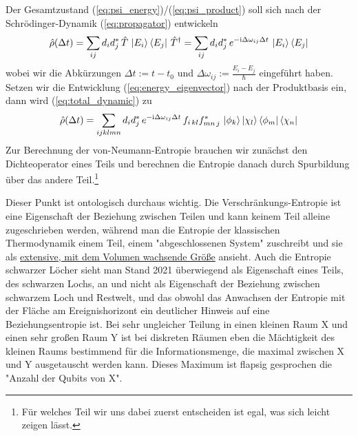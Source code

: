 \documentclass[12pt]{article}
\begin{document}
Der Gesamtzustand (\ref{eq:psi_energy})/(\ref{eq:psi_product}) soll sich nach der Schrödinger-Dynamik (\ref{eq:propagator}) entwickeln
\begin{equation}
\label{eq:total_dynamic}
\hat{\rho}(\Delta t)=\sum_{ij}d_{i}d_{j}^*\, \hat{T}\, \ket{E_i}\bra{E_j}\, {\hat{T}}^\dagger
= \sum_{ij}d_{i}d_{j}^*\, e^{-\mathrm i \Delta\omega_{ij}\Delta t}\, \ket{E_i}\bra{E_j}
\end{equation}
wobei wir die Abkürzungen $\Delta t := t-t_0$ und $\Delta \omega_{ij} := \frac{E_i - E_j}{\hbar}$ eingeführt haben. Setzen wir die Entwicklung (\ref{eq:energy_eigenvector}) nach der Produktbasis ein, dann wird  (\ref{eq:total_dynamic}) zu 
\begin{equation*}
\hat{\rho}(\Delta t) = \sum_{ijklmn}d_{i}d_{j}^*\, e^{-\mathrm i \Delta\omega_{ij}\Delta t}\, 
f_{i\,kl}f_{mn\,j}^*\, \ket{\phi_k}\ket{\chi_l}\bra{\phi_m}\bra{\chi_n}
\end{equation*}
Zur Berechnung der von-Neumann-Entropie brauchen wir zunächst den Dichteoperator eines Teils und berechnen die Entropie danach durch Spurbildung über das andere Teil.\footnote{Für welches Teil wir uns dabei zuerst entscheiden ist egal, was sich leicht zeigen lässt.}

Dieser Punkt ist ontologisch durchaus wichtig. Die Verschränkungs-Entropie ist eine Eigenschaft der Beziehung zwischen Teilen und kann keinem Teil alleine zugeschrieben werden, während man die Entropie der klassischen Thermodynamik einem Teil, einem "abgeschlossenen System" zuschreibt und sie als \href{https://de.wikipedia.org/wiki/Extensive_Gr%C3%B6%C3%9Fe}{extensive, mit dem Volumen wachsende Größe} ansieht. Auch die Entropie schwarzer Löcher sieht man Stand 2021 überwiegend als Eigenschaft eines Teils, des schwarzen Lochs, an und nicht als Eigenschaft der Beziehung zwischen schwarzem Loch und Restwelt, und das obwohl das Anwachsen der Entropie mit der Fläche am Ereignishorizont ein deutlicher Hinweis auf eine Beziehungsentropie ist. Bei sehr ungleicher Teilung in einen kleinen Raum X und einen sehr großen Raum Y ist bei diskreten Räumen eben die Mächtigkeit des kleinen Raums bestimmend für die Informationsmenge, die maximal zwischen X und Y ausgetauscht werden kann. Dieses Maximum ist flapsig gesprochen die "Anzahl der Qubits von X".
\end{document}
